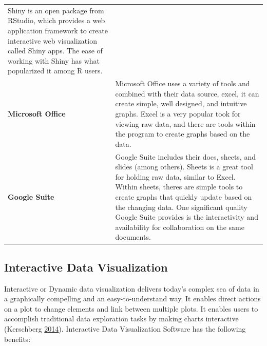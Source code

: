\documentclass[]{book}
\begin{document}
\begin{longtable}[]{@{}ll@{}}
\begin{minipage}[t]{0.79\columnwidth}
Shiny is an open package from RStudio, which provides a web application framework to create interactive web visualization called Shiny apps. The ease of working with Shiny has what popularized it among R users.\strut
\end{minipage}\tabularnewline
\begin{minipage}[t]{0.15\columnwidth}\raggedright
\textbf{Microsoft Office}\strut
\end{minipage} & \begin{minipage}[t]{0.79\columnwidth}\raggedright
Microsoft Office uses a variety of tools and combined with their data source, excel, it can create simple, well designed, and intuitive graphs. Excel is a very popular took for viewing raw data, and there are tools within the program to create graphs based on the data.\strut
\end{minipage}\tabularnewline
\begin{minipage}[t]{0.15\columnwidth}\raggedright
\textbf{Google Suite}\strut
\end{minipage} & \begin{minipage}[t]{0.79\columnwidth}\raggedright
Google Suite includes their docs, sheets, and slides (among others). Sheets is a great tool for holding raw data, similar to Excel. Within sheets, theres are simple tools to create graphs that quickly update based on the changing data. One significant quality Google Suite provides is the interactivity and availability for collaboration on the same documents.\strut
\end{minipage}\tabularnewline
\bottomrule
\end{longtable}

\hypertarget{interactive-data-visualization}{%
\subsection{Interactive Data Visualization}\label{interactive-data-visualization}}

Interactive or Dynamic data visualization delivers today's complex sea of data in a graphically compelling and an easy-to-understand way. It enables direct actions on a plot to change elements and link between multiple plots. It enables users to accomplish traditional data exploration tasks by making charts interactive (Kerschberg \protect\hyperlink{ref-benefits_interactive_viz}{2014}). Interactive Data Visualization Software has the following benefits:
\end{document}
